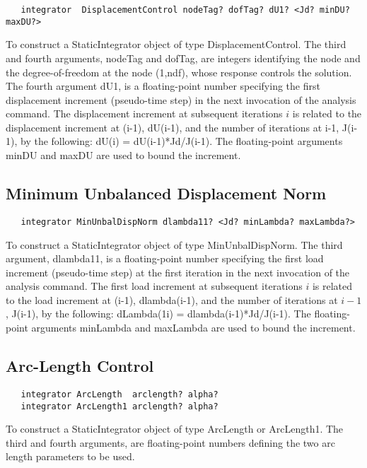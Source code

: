 \documentclass[12pt]{article}
\begin{document}
{\sf\small
\begin{verbatim}
   integrator  DisplacementControl nodeTag? dofTag? dU1? <Jd? minDU? maxDU?>
\end{verbatim}
}

To construct a StaticIntegrator object of type DisplacementControl. The third
and fourth arguments, nodeTag and dofTag, are integers identifying the
node and the degree-of-freedom at the node (1,ndf), whose response
controls the solution. The fourth argument dU1, is a floating-point
number specifying the first displacement increment (pseudo-time step)
in the next invocation of the analysis command. The displacement
increment at subsequent iterations $i$ is related to the displacement
increment at (i-1), dU(i-1), and the number of iterations at i-1,
J(i-1), by the following: dU(i) = dU(i-1)*Jd/J(i-1). The
floating-point arguments minDU and maxDU are used to bound the
increment.

\subsection{Minimum Unbalanced Displacement Norm}

{\sf\small
\begin{verbatim}
   integrator MinUnbalDispNorm dlambda11? <Jd? minLambda? maxLambda?>
\end{verbatim}
}

To construct a StaticIntegrator object of type MinUnbalDispNorm. The third
argument, dlambda11, is a floating-point number specifying the first
load increment (pseudo-time step) at the first iteration in the next
invocation of the analysis command. The first load increment at subsequent
iterations $i$ is related to the load increment at (i-1),
dlambda(i-1), and the number of iterations at $i-1$, J(i-1), by the
following: dLambda(1i) = dlambda(i-1)*Jd/J(i-1). The floating-point
arguments minLambda and maxLambda are used to bound the increment.

\subsection{Arc-Length Control}

{\sf\small
\begin{verbatim}
   integrator ArcLength  arclength? alpha?
   integrator ArcLength1 arclength? alpha?
\end{verbatim}
}

To construct a StaticIntegrator object of type ArcLength or
ArcLength1. The third and fourth arguments, are floating-point numbers
defining the two arc length parameters to be used.
\end{document}
